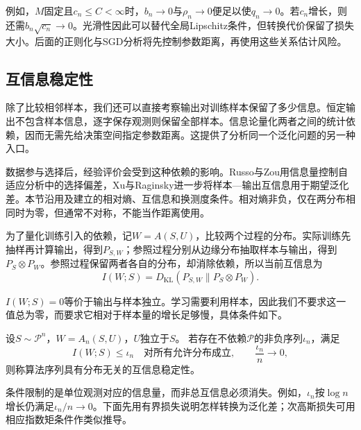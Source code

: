 例如，$M$固定且$c_n\leq C<\infty$时，$b_n\to0$与$\rho_n\to0$便足以使$q_n\to0$。若$c_n$增长，则还需$b_n\sqrt{c_n}\to0$。光滑性因此可以替代全局Lipschitz条件，但转换代价保留了损失大小。后面的正则化与SGD分析将先控制参数距离，再使用这些关系估计风险。

\subsection{互信息稳定性}
\label{sec:information-stability}

除了比较相邻样本，我们还可以直接考察输出对训练样本保留了多少信息。恒定输出不包含样本信息，逐字保存观测则保留全部样本。信息论量化两者之间的统计依赖，因而无需先给决策空间指定参数距离。这提供了分析同一个泛化问题的另一种入口。

数据参与选择后，经验评价会受到这种依赖的影响。Russo与Zou用信息量控制自适应分析中的选择偏差，Xu与Raginsky进一步将样本—输出互信息用于期望泛化差。本节沿用及建立的相对熵、互信息和换测度条件。相对熵非负，仅在两分布相同时为零，但通常不对称，不能当作距离使用。

为了量化训练引入的依赖，记$W=A(S,U)$，比较两个过程的分布。实际训练先抽样再计算输出，得到$P_{S,W}$；参照过程分别从边缘分布抽取样本与输出，得到$P_S\otimes P_W$。参照过程保留两者各自的分布，却消除依赖，所以当前互信息为
\[
 I(W;S)=D_{\mathrm{KL}}(P_{S,W}\|P_S\otimes P_W).
\]

$I(W;S)=0$等价于输出与样本独立。学习需要利用样本，因此我们不要求这一值总为零，而要求它相对于样本量的增长足够慢，具体条件如下。

\begin{definition}[互信息稳定性]
\label{def:mutual-information-stability}
设$S\sim\mathcal P^n$，$W=A_n(S,U)$，$U$独立于$S$。
若存在不依赖$\mathcal P$的非负序列$\iota_n$，满足
\[
 I(W;S)\leq\iota_n\quad\text{对所有允许分布成立},
 \qquad \frac{\iota_n}{n}\longrightarrow0,
\]
则称算法序列具有分布无关的互信息稳定性。
\end{definition}

条件限制的是单位观测对应的信息量，而非总互信息必须消失。例如，$\iota_n$按$\log n$增长仍满足$\iota_n/n\to0$。下面先用有界损失说明怎样转换为泛化差；次高斯损失可用相应指数矩条件作类似推导。

